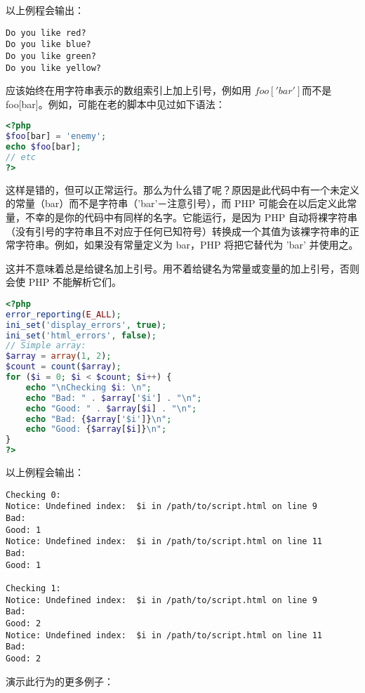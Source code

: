 以上例程会输出：


\begin{verbatim}
Do you like red?
Do you like blue?
Do you like green?
Do you like yellow?
\end{verbatim}

应该始终在用字符串表示的数组索引上加上引号，例如用 $foo['bar'] 而不是 $foo[bar]。例如，可能在老的脚本中见过如下语法：

\begin{lstlisting}[language=PHP]
<?php
$foo[bar] = 'enemy';
echo $foo[bar];
// etc
?>
\end{lstlisting}


这样是错的，但可以正常运行。那么为什么错了呢？原因是此代码中有一个未定义的常量（bar）而不是字符串（'bar'－注意引号），而 PHP 可能会在以后定义此常量，不幸的是你的代码中有同样的名字。它能运行，是因为 PHP 自动将裸字符串（没有引号的字符串且不对应于任何已知符号）转换成一个其值为该裸字符串的正常字符串。例如，如果没有常量定义为 bar，PHP 将把它替代为 'bar' 并使用之。

这并不意味着总是给键名加上引号。用不着给键名为常量或变量的加上引号，否则会使 PHP 不能解析它们。

\begin{lstlisting}[language=PHP]
<?php
error_reporting(E_ALL);
ini_set('display_errors', true);
ini_set('html_errors', false);
// Simple array:
$array = array(1, 2);
$count = count($array);
for ($i = 0; $i < $count; $i++) {
    echo "\nChecking $i: \n";
    echo "Bad: " . $array['$i'] . "\n";
    echo "Good: " . $array[$i] . "\n";
    echo "Bad: {$array['$i']}\n";
    echo "Good: {$array[$i]}\n";
}
?>
\end{lstlisting}


以上例程会输出：


\begin{verbatim}
Checking 0: 
Notice: Undefined index:  $i in /path/to/script.html on line 9
Bad: 
Good: 1
Notice: Undefined index:  $i in /path/to/script.html on line 11
Bad: 
Good: 1

Checking 1: 
Notice: Undefined index:  $i in /path/to/script.html on line 9
Bad: 
Good: 2
Notice: Undefined index:  $i in /path/to/script.html on line 11
Bad: 
Good: 2
\end{verbatim}

演示此行为的更多例子：


